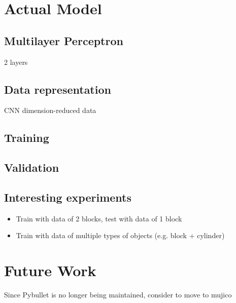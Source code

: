 \documentclass[11pt, a4paper]{report}
\theoremstyle{definition}
\begin{document}
\chapter{Actual Model}
\label{chap:5}

\section{Multilayer Perceptron}
2 layers

\section{Data representation}
CNN dimension-reduced data

\section{Training}

\section{Validation}

\section{Interesting experiments}
\begin{itemize}
    \item Train with data of 2 blocks, test with data of 1 block
    \item Train with data of multiple types of objects (e.g. block + cylinder)
\end{itemize}



\chapter{Future Work}
\label{chap:6}
Since Pybullet is no longer being maintained, consider to move to mujico



\appendix
\end{document}
